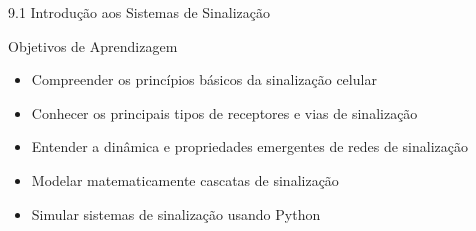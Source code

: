 \begin{frame}{9.1 Introdução aos Sistemas de Sinalização}
\begin{block}{Objetivos de Aprendizagem}
\begin{itemize}
    \item Compreender os princípios básicos da sinalização celular
    \item Conhecer os principais tipos de receptores e vias de sinalização
    \item Entender a dinâmica e propriedades emergentes de redes de sinalização
    \item Modelar matematicamente cascatas de sinalização
    \item Simular sistemas de sinalização usando Python
\end{itemize}
\end{block}

\vspace{0.3cm}

\end{frame}

